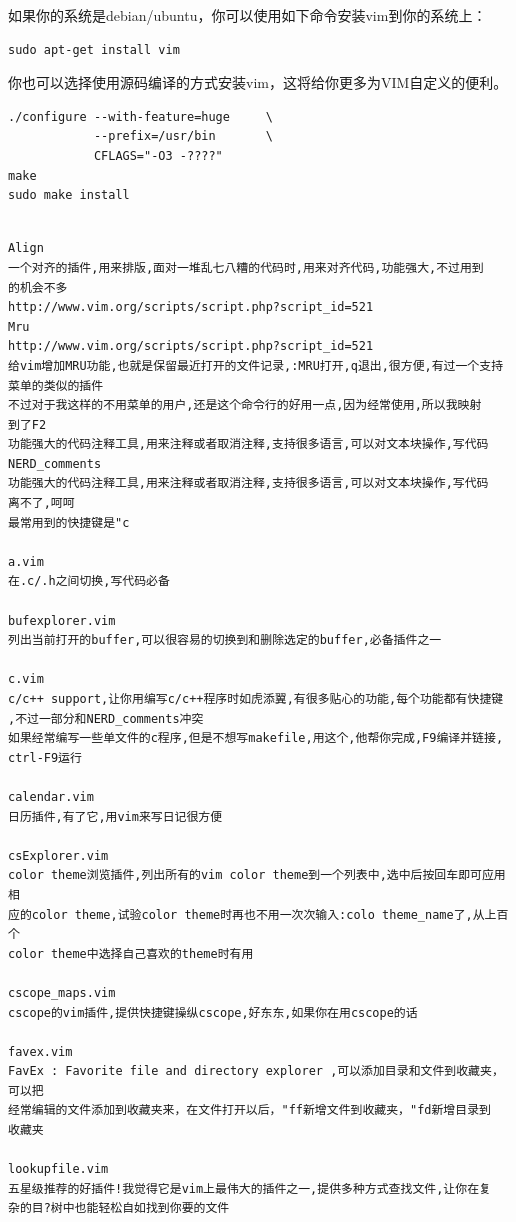 如果你的系统是debian/ubuntu，你可以使用如下命令安装vim到你的系统上：
\begin{lstlisting}
sudo apt-get install vim
\end{lstlisting}

你也可以选择使用源码编译的方式安装vim，这将给你更多为VIM自定义的便利。
\begin{lstlisting}
./configure --with-feature=huge     \
            --prefix=/usr/bin       \
            CFLAGS="-O3 -????"
make
sudo make install
\end{lstlisting}


\begin{lstlisting}

Align
一个对齐的插件,用来排版,面对一堆乱七八糟的代码时,用来对齐代码,功能强大,不过用到
的机会不多
http://www.vim.org/scripts/script.php?script_id=521
Mru
http://www.vim.org/scripts/script.php?script_id=521
给vim增加MRU功能,也就是保留最近打开的文件记录,:MRU打开,q退出,很方便,有过一个支持
菜单的类似的插件
不过对于我这样的不用菜单的用户,还是这个命令行的好用一点,因为经常使用,所以我映射
到了F2
功能强大的代码注释工具,用来注释或者取消注释,支持很多语言,可以对文本块操作,写代码
NERD_comments
功能强大的代码注释工具,用来注释或者取消注释,支持很多语言,可以对文本块操作,写代码
离不了,呵呵
最常用到的快捷键是"c

a.vim
在.c/.h之间切换,写代码必备

bufexplorer.vim
列出当前打开的buffer,可以很容易的切换到和删除选定的buffer,必备插件之一

c.vim
c/c++ support,让你用编写c/c++程序时如虎添翼,有很多贴心的功能,每个功能都有快捷键
,不过一部分和NERD_comments冲突
如果经常编写一些单文件的c程序,但是不想写makefile,用这个,他帮你完成,F9编译并链接,
ctrl-F9运行

calendar.vim
日历插件,有了它,用vim来写日记很方便

csExplorer.vim
color theme浏览插件,列出所有的vim color theme到一个列表中,选中后按回车即可应用相
应的color theme,试验color theme时再也不用一次次输入:colo theme_name了,从上百个
color theme中选择自己喜欢的theme时有用

cscope_maps.vim
cscope的vim插件,提供快捷键操纵cscope,好东东,如果你在用cscope的话

favex.vim
FavEx : Favorite file and directory explorer ,可以添加目录和文件到收藏夹，可以把
经常编辑的文件添加到收藏夹来，在文件打开以后，"ff新增文件到收藏夹，"fd新增目录到
收藏夹

lookupfile.vim
五星级推荐的好插件!我觉得它是vim上最伟大的插件之一,提供多种方式查找文件,让你在复
杂的目?树中也能轻松自如找到你要的文件


\end{lstlisting}
